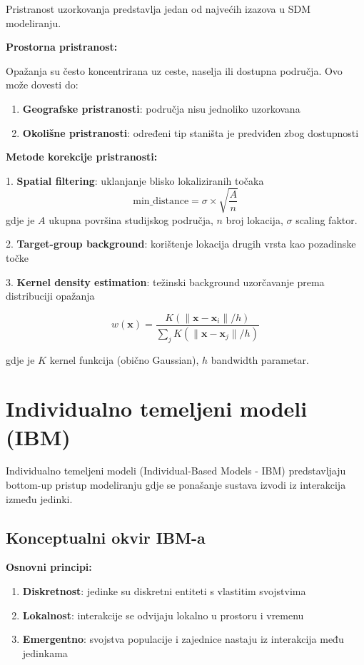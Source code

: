 \documentclass[11pt,oneside]{book}
\begin{document}
Pristranost uzorkovanja predstavlja jedan od najvećih izazova u SDM modeliranju.

\textbf{Prostorna pristranost:}

Opažanja su često koncentrirana uz ceste, naselja ili dostupna područja. Ovo može dovesti do:

\begin{enumerate}
	\item \textbf{Geografske pristranosti}: područja nisu jednoliko uzorkovana
	\item \textbf{Okolišne pristranosti}: određeni tip staništa je predviđen zbog dostupnosti
\end{enumerate}

\textbf{Metode korekcije pristranosti:}

1. \textbf{Spatial filtering}: uklanjanje blisko lokaliziranih točaka
\begin{equation}
	\text{min\_distance} = \sigma \times \sqrt{\frac{A}{n}}
\end{equation}
gdje je $A$ ukupna površina studijskog područja, $n$ broj lokacija, $\sigma$ scaling faktor.

2. \textbf{Target-group background}: korištenje lokacija drugih vrsta kao pozadinske točke

3. \textbf{Kernel density estimation}: težinski background uzorčavanje prema distribuciji opažanja

\begin{equation}
	w(\mathbf{x}) = \frac{K(\|\mathbf{x} - \mathbf{x}_i\|/h)}{\sum_j K(\|\mathbf{x} - \mathbf{x}_j\|/h)}
\end{equation}

gdje je $K$ kernel funkcija (obično Gaussian), $h$ bandwidth parametar.

\section{Individualno temeljeni modeli (IBM)}

Individualno temeljeni modeli (Individual-Based Models - IBM) predstavljaju bottom-up pristup modeliranju gdje se ponašanje sustava izvodi iz interakcija između jedinki.

\subsection{Konceptualni okvir IBM-a}

\textbf{Osnovni principi:}

\begin{enumerate}
	\item \textbf{Diskretnost}: jedinke su diskretni entiteti s vlastitim svojstvima
	\item \textbf{Lokalnost}: interakcije se odvijaju lokalno u prostoru i vremenu
	\item \textbf{Emergentno}: svojstva populacije i zajednice nastaju iz interakcija među jedinkama
\end{enumerate}
\end{document}
